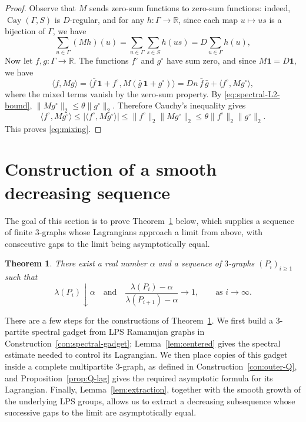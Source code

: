 \documentclass[10pt]{article}
\numberwithin{equation}{section}
\newtheorem{theorem}{Theorem}[section]
\DeclareMathOperator{\Cay}{Cay}
\newcommand{\R}{\mathbb{R}}
\begin{document}
\begin{proof}
Observe that $M$ sends zero-sum functions to zero-sum functions: indeed, $\Cay(\Gamma,S)$ is $D$-regular, and for any $h\colon\Gamma\to\R$, since each map $u\mapsto us$ is a bijection of $\Gamma$, we have 
\[
        \sum_{u\in\Gamma}(Mh)(u)=\sum_{u\in\Gamma}\sum_{s\in S}h(us)=D\sum_{u\in\Gamma}h(u),
\]
Now let $f,g\colon\Gamma\to\R$. The functions $f^\circ$ and $g^\circ$ have sum zero, and since $M\mathbf 1=D\mathbf 1$, we have
\[
        \langle f,Mg\rangle = \langle \bar f\,\mathbf 1+f^\circ, M(\bar g\,\mathbf 1+g^\circ)\rangle = Dn\,\bar f\,\bar g+\langle f^\circ,Mg^\circ\rangle ,
\]
where the mixed terms vanish by the zero-sum property. By \eqref{eq:spectral-L2-bound}, $\|Mg^\circ\|_2\le\theta\|g^\circ\|_2$. Therefore Cauchy's inequality gives
\[
        \langle f^\circ,Mg^\circ\rangle \le |\langle f^\circ,Mg^\circ\rangle| \le \|f^\circ\|_2\|Mg^\circ\|_2 \le \theta\|f^\circ\|_2\|g^\circ\|_2 .
\]
This proves \eqref{eq:mixing}.
\end{proof}
\section{Construction of a smooth decreasing sequence}
\label{sec:smooth-sequence-construction}
%
The goal of this section is to prove Theorem~\ref{thm:smooth-sequence} below, which supplies a sequence of finite $3$-graphs whose Lagrangians approach a limit from above, with consecutive gaps to the limit being asymptotically equal. 

\begin{theorem}\label{thm:smooth-sequence}
There exist a real number $\alpha$ and a sequence of $3$-graphs $(P_i)_{i\ge 1}$ such that
\[
        \lambda(P_i)\downarrow \alpha\quad\text{and}\quad \frac{\lambda(P_i)-\alpha}{\lambda(P_{i+1})-\alpha}\to 1,\qquad\text{as $i\to\infty$}. 
\]
\end{theorem}

There are a few steps for the constructions of Theorem~\ref{thm:smooth-sequence}. 
We first build a $3$-partite spectral gadget from LPS Ramanujan graphs in Construction~\ref{con:spectral-gadget}; Lemma~\ref{lem:centered} gives the spectral estimate needed to control its Lagrangian. We then place copies of this gadget inside a complete multipartite $3$-graph, as defined in Construction~\ref{con:outer-Q}, and Proposition~\ref{prop:Q-lag} gives the required asymptotic formula for its Lagrangian. Finally, Lemma~\ref{lem:extraction}, together with the smooth growth of the underlying LPS groups, allows us to extract a decreasing subsequence whose successive gaps to the limit are asymptotically equal.
\end{document}
